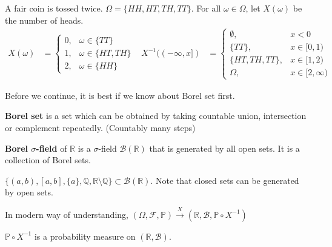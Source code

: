 \documentclass{huhtakm-template-book}
\newcommand{\prob}{\mathbb{P}}
\begin{document}
    \newpage
    \begin{eg}
        \label{Toss coin twice}
        A fair coin is tossed twice. $\Omega=\{HH,HT,TH,TT\}$. For all $\omega\in\Omega$, let $X(\omega)$ be the number of heads.
        \begin{align*}
            X(\omega)&=\begin{cases}
                0, &\omega\in\{TT\}\\
                1, &\omega\in\{HT,TH\}\\
                2, &\omega\in\{HH\}
            \end{cases} & X^{-1}((-\infty,x])&=\begin{cases}
                \emptyset, & x<0\\
                \{TT\}, & x\in[0,1)\\
                \{HT,TH,TT\}, & x\in[1,2)\\
                \Omega, &x\in[2,\infty)
            \end{cases}
        \end{align*}
    \end{eg}
    Before we continue, it is best if we know about Borel set first.
    \begin{defn}
        \textbf{Borel set} is a set which can be obtained by taking countable union, intersection or complement repeatedly. (Countably many steps)
    \end{defn}
    \begin{defn}
        \textbf{Borel $\sigma$-field} of $\mathbb{R}$ is a $\sigma$-field $\mathcal{B}(\mathbb{R})$ that is generated by all open sets. It is a collection of Borel sets.
    \end{defn}
    \begin{eg}
        $\{(a,b),[a,b],\{a\},\mathbb{Q},\mathbb{R}\setminus\mathbb{Q}\}\subset\mathcal{B}(\mathbb{R})$. Note that closed sets can be generated by open sets.
    \end{eg}
    \begin{rem}
        In modern way of understanding, $(\Omega,\mathcal{F},\prob)\xrightarrow{X}(\mathbb{R},\mathcal{B},\prob\circ X^{-1})$
    \end{rem}
    \begin{cla}
        $\prob\circ X^{-1}$ is a probability measure on $(\mathbb{R},\mathcal{B})$.
    \end{cla}
\end{document}
